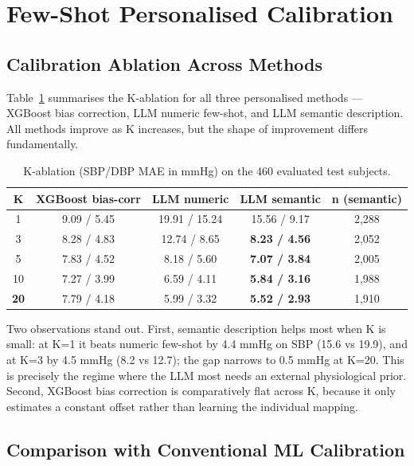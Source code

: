 \section{Few-Shot Personalised Calibration}

\subsection{Calibration Ablation Across Methods}

Table~\ref{tab:ablation} summarises the K-ablation for all three personalised methods --- XGBoost bias correction, LLM numeric few-shot, and LLM semantic description. All methods improve as K increases, but the shape of improvement differs fundamentally.

\begin{table}[H]
\centering
\begin{tabular}{ccccc}
\toprule
K & XGBoost bias-corr & LLM numeric & LLM semantic & n (semantic) \\
\midrule
1 & 9.09 / 5.45 & 19.91 / 15.24 & 15.56 / 9.17 & 2,288 \\
3 & 8.28 / 4.83 & 12.74 / 8.65 & \textbf{8.23 / 4.56} & 2,052 \\
5 & 7.83 / 4.52 & 8.18 / 5.60 & \textbf{7.07 / 3.84} & 2,005 \\
10 & 7.27 / 3.99 & 6.59 / 4.11 & \textbf{5.84 / 3.16} & 1,988 \\
\textbf{20} & 7.79 / 4.18 & 5.99 / 3.32 & \textbf{5.52 / 2.93} & 1,910 \\
\bottomrule
\end{tabular}
\caption{K-ablation (SBP/DBP MAE in mmHg) on the 460 evaluated test subjects.}
\label{tab:ablation}
\end{table}

Two observations stand out. First, semantic description helps most when K is small: at K=1 it beats numeric few-shot by 4.4 mmHg on SBP (15.6 vs 19.9), and at K=3 by 4.5 mmHg (8.2 vs 12.7); the gap narrows to 0.5 mmHg at K=20. This is precisely the regime where the LLM most needs an external physiological prior. Second, XGBoost bias correction is comparatively flat across K, because it only estimates a constant offset rather than learning the individual mapping.

\subsection{Comparison with Conventional ML Calibration}

